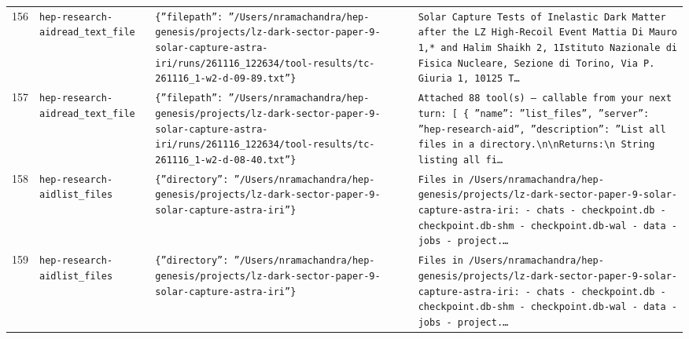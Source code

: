 \documentclass[11pt,a4paper]{article}
\begin{document}
\begin{longtable}{@{}p{}p{}p{}p{}@{}}
156 & \texttt{hep-research-aid}\newline\texttt{read\_\allowbreak{}text\_\allowbreak{}file} & \texttt{\{''filepath'':\allowbreak{} ''/\allowbreak{}Users/\allowbreak{}nramachandra/\allowbreak{}hep-genesis/\allowbreak{}projects/\allowbreak{}lz-dark-sector-paper-9-solar-capture-astra-iri/\allowbreak{}runs/\allowbreak{}261116\_\allowbreak{}122634/\allowbreak{}tool-results/\allowbreak{}tc-261116\_\allowbreak{}1-w2-d-09-89.txt''\}\allowbreak{}} & \texttt{Solar Capture Tests of Inelastic Dark Matter after the LZ High-Recoil Event Mattia Di Mauro 1,\allowbreak{}* and Halim Shaikh 2,\allowbreak{}\dag{}\allowbreak{} 1Istituto Nazionale di Fisica Nucleare,\allowbreak{} Sezione di Torino,\allowbreak{} Via P. Giuria 1,\allowbreak{} 10125 T\ldots{}\allowbreak{}} \\
157 & \texttt{hep-research-aid}\newline\texttt{read\_\allowbreak{}text\_\allowbreak{}file} & \texttt{\{''filepath'':\allowbreak{} ''/\allowbreak{}Users/\allowbreak{}nramachandra/\allowbreak{}hep-genesis/\allowbreak{}projects/\allowbreak{}lz-dark-sector-paper-9-solar-capture-astra-iri/\allowbreak{}runs/\allowbreak{}261116\_\allowbreak{}122634/\allowbreak{}tool-results/\allowbreak{}tc-261116\_\allowbreak{}1-w2-d-08-40.txt''\}\allowbreak{}} & \texttt{Attached 88 tool(s)\allowbreak{} --- callable from your next turn:\allowbreak{} [  \{   ''name'':\allowbreak{} ''list\_\allowbreak{}files'',\allowbreak{}   ''server'':\allowbreak{} ''hep-research-aid'',\allowbreak{}   ''description'':\allowbreak{} ''List all files in a directory.\textbackslash{}\allowbreak{}n\textbackslash{}\allowbreak{}nReturns:\allowbreak{}\textbackslash{}\allowbreak{}n    String listing all fi\ldots{}\allowbreak{}} \\
158 & \texttt{hep-research-aid}\newline\texttt{list\_\allowbreak{}files} & \texttt{\{''directory'':\allowbreak{} ''/\allowbreak{}Users/\allowbreak{}nramachandra/\allowbreak{}hep-genesis/\allowbreak{}projects/\allowbreak{}lz-dark-sector-paper-9-solar-capture-astra-iri''\}\allowbreak{}} & \texttt{Files in /\allowbreak{}Users/\allowbreak{}nramachandra/\allowbreak{}hep-genesis/\allowbreak{}projects/\allowbreak{}lz-dark-sector-paper-9-solar-capture-astra-iri:\allowbreak{}   - chats   - checkpoint.db   - checkpoint.db-shm   - checkpoint.db-wal   - data   - jobs   - project.\ldots{}\allowbreak{}} \\
159 & \texttt{hep-research-aid}\newline\texttt{list\_\allowbreak{}files} & \texttt{\{''directory'':\allowbreak{} ''/\allowbreak{}Users/\allowbreak{}nramachandra/\allowbreak{}hep-genesis/\allowbreak{}projects/\allowbreak{}lz-dark-sector-paper-9-solar-capture-astra-iri''\}\allowbreak{}} & \texttt{Files in /\allowbreak{}Users/\allowbreak{}nramachandra/\allowbreak{}hep-genesis/\allowbreak{}projects/\allowbreak{}lz-dark-sector-paper-9-solar-capture-astra-iri:\allowbreak{}   - chats   - checkpoint.db   - checkpoint.db-shm   - checkpoint.db-wal   - data   - jobs   - project.\ldots{}\allowbreak{}} \\

\end{longtable}
\end{document}
